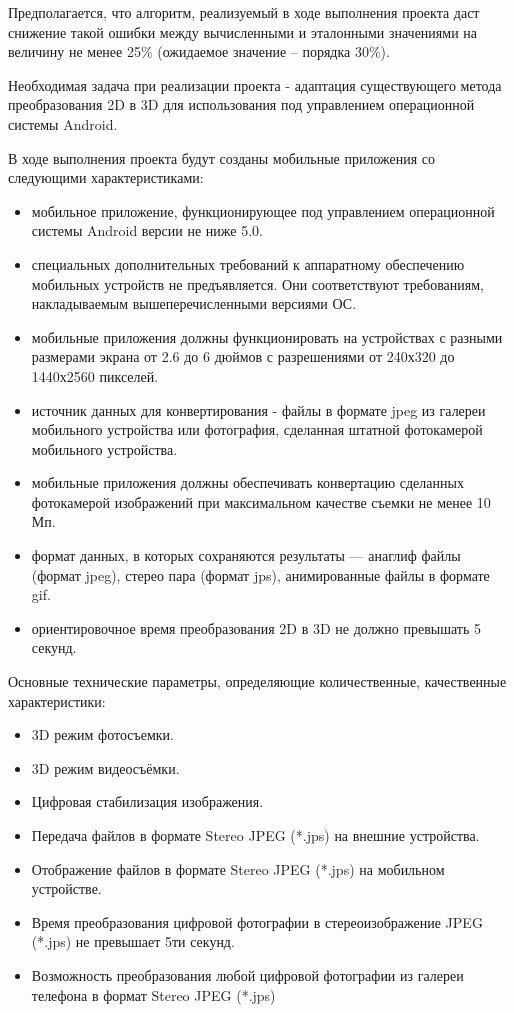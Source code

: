 Предполагается, что алгоритм, реализуемый в ходе выполнения проекта даст снижение такой ошибки между вычисленными и эталонными значениями на величину не менее 25\% (ожидаемое значение – порядка 30\%).

Необходимая задача при реализации проекта - адаптация существующего метода преобразования 2D в 3D для использования под управлением операционной системы Android.

В ходе выполнения проекта будут созданы мобильные приложения со следующими характеристиками:

\begin{itemize}
	\item мобильное приложение, функционирующее под управлением операционной системы Android версии не ниже 5.0.
	\item специальных дополнительных требований к аппаратному обеспечению мобильных устройств не предъявляется. Они соответствуют требованиям, накладываемым вышеперечисленными версиями ОС.
	\item мобильные приложения должны функционировать на устройствах с разными размерами экрана от 2.6 до 6 дюймов с разрешениями от 240х320 до 1440х2560 пикселей.
	\item источник данных для конвертирования - файлы в формате jpeg из галереи мобильного устройства или фотография, сделанная штатной фотокамерой мобильного устройства.
	\item мобильные приложения должны обеспечивать конвертацию сделанных фотокамерой изображений при максимальном качестве съемки не менее 10 Мп.
	\item формат данных, в которых сохраняются результаты --- анаглиф файлы (формат jpeg), стерео пара (формат jps), анимированные файлы в формате gif.
	\item ориентировочное время преобразования 2D в 3D не должно превышать 5 секунд.
\end{itemize}

Основные технические параметры, определяющие количественные, качественные характеристики:

\begin{itemize}
\item 3D режим фотосъемки.
\item 3D режим видеосъёмки. 
\item Цифровая стабилизация изображения.
\item Передача файлов в формате Stereo JPEG (*.jps) на внешние устройства. 
\item Отображение файлов в формате Stereo JPEG (*.jps) на мобильном устройстве. 
\item Время преобразования цифровой фотографии в стереоизображение JPEG (*.jps) не превышает 5ти секунд. 
\item Возможность преобразования любой цифровой фотографии из галереи телефона в формат Stereo JPEG (*.jps)
\end{itemize}

